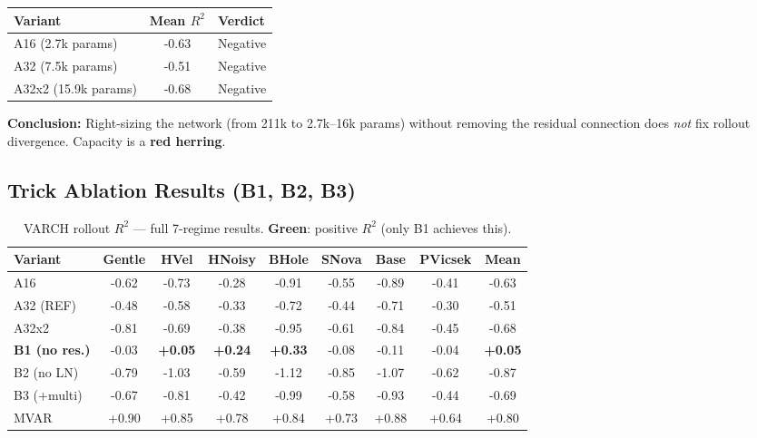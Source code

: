 \documentclass[11pt]{article}
\newcommand{\Rtwo}{R^2}
\newcommand{\good}[1]{\textcolor{goodgreen}{\textbf{#1}}}
\begin{document}
\begin{center}
\begin{tabular}{lS[table-format=+1.2]l}
\toprule
Variant & {Mean $\Rtwo$} & Verdict \\
\midrule
A16 (2.7k params) & -0.63 & Negative \\
A32 (7.5k params) & -0.51 & Negative \\
A32x2 (15.9k params) & -0.68 & Negative \\
\bottomrule
\end{tabular}
\end{center}

\textbf{Conclusion:} Right-sizing the network (from 211k to 2.7k--16k params)
without removing the residual connection does \emph{not} fix rollout divergence.
Capacity is a \textbf{red herring}.


\subsection{Trick Ablation Results (B1, B2, B3)}

\begin{table}[H]
\centering
\caption{VARCH rollout $\Rtwo$ --- full 7-regime results.
\good{Green}: positive $\Rtwo$ (only B1 achieves this).}
\label{tab:varch-r2}
\small
\setlength{\tabcolsep}{4pt}
\begin{tabular}{@{}l *{7}{S[table-format=+1.2]} S[table-format=+1.2] @{}}
\toprule
Variant & {Gentle} & {HVel} & {HNoisy} & {BHole} & {SNova} & {Base} & {PVicsek} & {Mean} \\
\midrule
A16      & -0.62 & -0.73 & -0.28 & -0.91 & -0.55 & -0.89 & -0.41 & -0.63 \\
A32 (REF)& -0.48 & -0.58 & -0.33 & -0.72 & -0.44 & -0.71 & -0.30 & -0.51 \\
A32x2    & -0.81 & -0.69 & -0.38 & -0.95 & -0.61 & -0.84 & -0.45 & -0.68 \\
\textbf{B1 (no res.)} & -0.03 & \good{+0.05} & \good{+0.24} & \good{+0.33} & -0.08 & -0.11 & -0.04 & \good{+0.05} \\
B2 (no LN)  & -0.79 & -1.03 & -0.59 & -1.12 & -0.85 & -1.07 & -0.62 & -0.87 \\
B3 (+multi) & -0.67 & -0.81 & -0.42 & -0.99 & -0.58 & -0.93 & -0.44 & -0.69 \\
\midrule
MVAR     & +0.90 & +0.85 & +0.78 & +0.84 & +0.73 & +0.88 & +0.64 & +0.80 \\
\bottomrule
\end{tabular}
\end{table}
\end{document}
